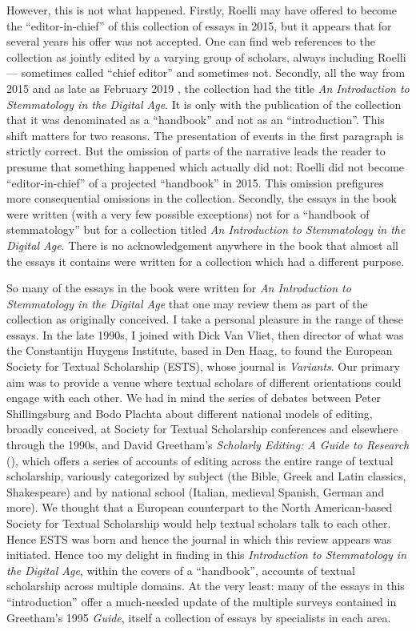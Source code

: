 \documentclass{article}
\begin{document}
However, this is not what happened. Firstly, Roelli may have
offered to become the ``editor-in-chief'' of this collection of essays
in 2015, but it appears that for several years his offer was not
accepted. One can find web references to the collection as jointly
edited by a varying group of scholars, always including Roelli ––
sometimes called ``chief editor'' and sometimes not. Secondly, all the
way from 2015 and as late as February 2019 \parencite{noauthor_terminology_2019}, the collection had the title \emph{An Introduction to
Stemmatology in the Digital Age}. It is only with the publication of the
collection that it was denominated as a ``handbook'' and not as an
``introduction''. This shift matters for two reasons. The presentation
of events in the first paragraph is strictly correct. But the omission
of parts of the narrative leads the reader to presume that something
happened which actually did not: Roelli did not become
``editor-in-chief'' of a projected ``handbook'' in 2015. This omission
prefigures more consequential omissions in the collection. Secondly, the
essays in the book were written (with a very few possible exceptions)
not for a ``handbook of stemmatology'' but for a collection titled
\emph{An Introduction to Stemmatology in the Digital Age}. There is no
acknowledgement anywhere in the book that almost all the essays it
contains were written for a collection which had a different purpose.

So many of the essays in the book were written for \emph{An
Introduction to Stemmatology in the Digital Age} that one may review
them as part of the collection as originally conceived. I take a
personal pleasure in the range of these essays. In the late 1990s, I
joined with Dick Van Vliet, then director of what was the Constantijn
Huygens Institute, based in Den Haag, to found the European Society for
Textual Scholarship (ESTS), whose journal is \emph{Variants}. Our
primary aim was to provide a venue where textual scholars of different
orientations could engage with each other. We had in mind the series of
debates between Peter Shillingsburg and Bodo Plachta about different
national models of editing, broadly conceived, at Society for Textual
Scholarship conferences and elsewhere through the 1990s, and David
Greetham's \emph{Scholarly Editing: A Guide to Research} (\citeyear{greetham_scholarly_1995}), which
offers a series of accounts of editing across the entire range of
textual scholarship, variously categorized by subject (the Bible, Greek
and Latin classics, Shakespeare) and by national school (Italian,
medieval Spanish, German and more). We thought that a European
counterpart to the North American-based Society for Textual Scholarship
would help textual scholars talk to each other. Hence ESTS was born and
hence the journal in which this review appears was initiated. Hence too
my delight in finding in this \emph{Introduction to Stemmatology in the
Digital Age}, within the covers of a ``handbook'', accounts of textual
scholarship across multiple domains. At the very least: many of the
essays in this ``introduction'' offer a much-needed update of the
multiple surveys contained in Greetham's 1995 \emph{Guide}, itself a
collection of essays by specialists in each area.
\end{document}
